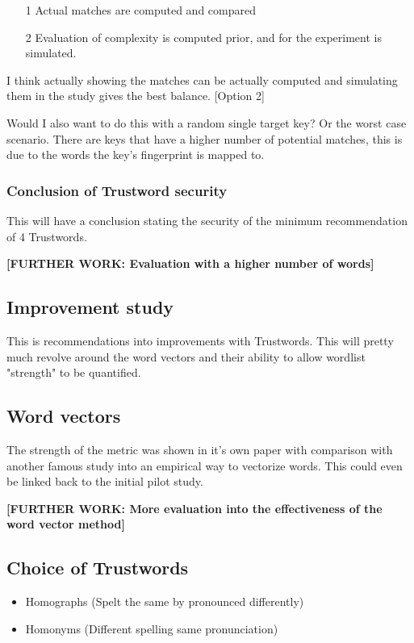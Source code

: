\begin{itemize}
    \item[1] Actual matches are computed and compared
    \item[2] Evaluation of complexity is computed prior, and for the experiment is simulated.
\end{itemize}

I think actually showing the matches can be actually computed and simulating them in the study gives the best balance. [Option 2]

Would I also want to do this with a random single target key? Or the worst case scenario. There are keys that have a higher number of potential matches, this is due to the words the key's fingerprint is mapped to.

\subsubsection{Conclusion of Trustword security}
This will have a conclusion stating the security of the minimum recommendation of 4 Trustwords.

\textbf{[FURTHER WORK: Evaluation with a higher number of words]}

\subsection{Improvement study}

This 
is recommendations into improvements with Trustwords. This will pretty much revolve around the word vectors and their ability to allow wordlist "strength" to be quantified. 

\subsection*{Word vectors}
The strength of the metric was shown in it's own paper with comparison with another famous study into an empirical way to vectorize words. This could even be linked back to the initial pilot study.

\textbf{[FURTHER WORK: More evaluation into the effectiveness of the word vector method]}

\subsection*{Choice of Trustwords}

\begin{itemize}
    \item Homographs (Spelt the same by pronounced differently)
    \item Homonyms   (Different spelling same pronunciation)
\end{itemize}

